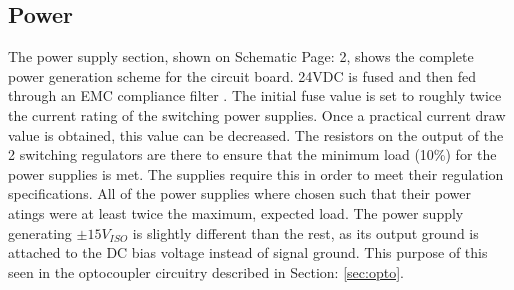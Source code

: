 \subsection {Power}
The power supply section, shown on Schematic Page: 2, shows the complete power generation scheme for the circuit board. 24VDC is fused and then fed through an EMC compliance filter \cite{5VswitchDatasheet}. The initial fuse value is set to roughly twice the current rating of the switching power supplies. Once a practical current draw value is obtained, this value can be decreased. The resistors on the output of the 2 switching regulators are there to ensure that the minimum load (10\%) for the power supplies is met. The supplies require this in order to meet their regulation specifications. All of the power supplies where chosen such that their power atings were at least twice the maximum, expected load. The power supply generating $\pm 15V_{ISO}$ is slightly different than the rest, as its output ground is attached to the DC bias voltage instead of signal ground. This purpose of this seen in the optocoupler circuitry described in Section: \ref{sec:opto}.

